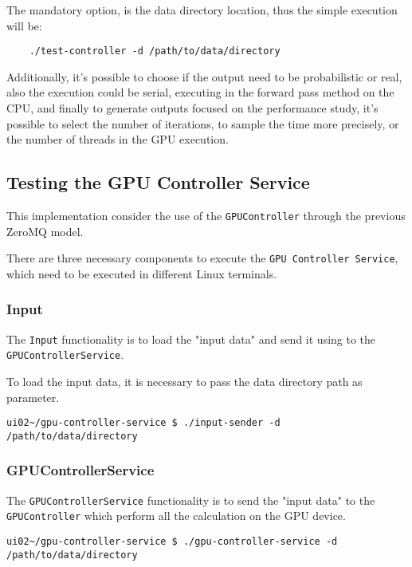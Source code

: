 The mandatory option, is the data directory location, thus the simple execution will be:

\begin{verbatim}
    ./test-controller -d /path/to/data/directory
\end{verbatim}

Additionally, it's possible to choose if the output need to be probabilistic or real,
also the execution could be serial, executing in the forward pass method on the CPU,
and finally to generate outputs focused on the performance study,
it's possible to select the number of iterations, to sample the time more precisely,
or the number of threads in the GPU execution.

\subsection*{Testing the GPU Controller Service}

This implementation consider the use of the \texttt{GPUController} through
the previous ZeroMQ model.

There are three necessary components to execute the \texttt{GPU Controller Service},
which need to be executed in different Linux terminals.

\subsubsection*{Input}

The \texttt{Input} functionality is to load the "input data" and send it
using to the \texttt{GPUControllerService}.

To load the input data,
it is necessary to pass the data directory path as parameter.

\begin{verbatim}
ui02~/gpu-controller-service $ ./input-sender -d /path/to/data/directory
\end{verbatim}

\subsubsection*{GPUControllerService}

The \texttt{GPUControllerService} functionality is to send the "input data"
to the \texttt{GPUController} which perform all the calculation on the GPU device.

\begin{verbatim}
ui02~/gpu-controller-service $ ./gpu-controller-service -d /path/to/data/directory
\end{verbatim}

